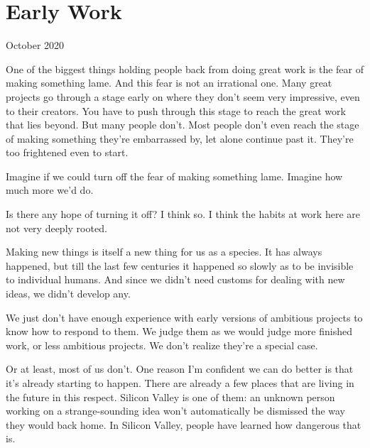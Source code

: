 \chapter{Early Work}


            
              
                

October 2020

One of the biggest things holding
                  people back from doing great work is the fear of making
                  something lame. And this fear is not an irrational one. Many
                  great projects go through a stage early on where they don't
                  seem very impressive, even to their creators. You have to push
                  through this stage to reach the great work that lies beyond.
                  But many people don't. Most people don't even reach the stage
                  of making something they're embarrassed by, let alone continue
                  past it. They're too frightened even to start.

Imagine
                  if we could turn off the fear of making something lame.
                  Imagine how much more we'd do.

Is there any hope of
                  turning it off? I think so. I think the habits at work here
                  are not very deeply rooted.

Making new things is
                  itself a new thing for us as a species. It has always
                  happened, but till the last few centuries it happened so
                  slowly as to be invisible to individual humans. And since we
                  didn't need customs for dealing with new ideas, we didn't
                  develop any.

We just don't have enough experience
                  with early versions of ambitious projects to know how to
                  respond to them. We judge them as we would judge more finished
                  work, or less ambitious projects. We don't realize they're a
                  special case.

Or at least, most of us don't. One
                  reason I'm confident we can do better is that it's already
                  starting to happen. There are already a few places that are
                  living in the future in this respect. Silicon Valley is one of
                  them: an unknown person working on a strange-sounding idea
                  won't automatically be dismissed the way they would back home.
                  In Silicon Valley, people have learned how dangerous that
                  is.

